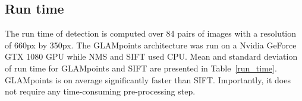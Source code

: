 \subsection{Run time}

The run time of detection is computed over 84 pairs of images with a resolution of 660px by 350px. The \ac{GLAMpoints} architecture was run on a Nvidia GeForce GTX 1080 GPU while \ac{NMS} and \ac{SIFT} used CPU. Mean and standard deviation of run time for \ac{GLAMpoints} and \ac{SIFT} are presented in Table~\ref{run_time}. GLAMpoints is on average significantly faster than SIFT. Importantly, it does not require any time-consuming pre-processing step. 

\begin{table}
\centering
\caption{Average detection run time [ms] per image for GLAMpoints and \ac{SIFT} detectors.}
\vspace{-1mm}\label{run_time}
\end{table}

